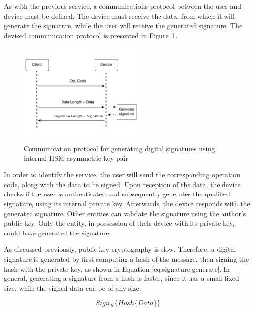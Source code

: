 As with the previous service, a communications protocol between the user and device must be defined. The device must receive the data, from which it will generate the signature, while the user will receive the generated signature.
The devised communication protocol is presented in Figure~\ref{fig:protocol:signature-generate}.

\begin{figure}[h!]
	\centering
	\includegraphics[width=0.55\textwidth]{./Images/signature-generate.png}
	\caption{Communication protocol for generating digital signatures using internal HSM asymmetric key pair}
	\label{fig:protocol:signature-generate}
\end{figure}

In order to identify the service, the user will send the corresponding operation code, along with the data to be signed.
Upon reception of the data, the device checks if the user is authenticated and subsequently generates the qualified signature, using its internal private key.
Afterwards, the device responds with the generated signature. 
Other entities can validate the signature using the author's public key. Only the entity, in possession of their device with its private key, could have generated the signature.

As discussed previously, public key cryptography is slow. Therefore, a digital signature is generated by first computing a hash of the message, then signing the hash with the private key, as shown in Equation \ref{eq:signature-generate}. In general, generating a signature from a hash is faster, since it has a small fixed size, while the signed data can be of any size.

\begin{equation}
	\label{eq:signature-generate}
	Sign_{K}\{Hash\{Data\}\}
\end{equation}


